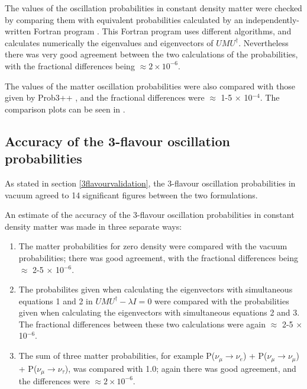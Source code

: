 The values of the oscillation probabilities in constant density matter were checked by comparing them with equivalent probabilities calculated by an 
independently-written Fortran program \cite{sloan}. This Fortran program uses different algorithms, and calculates numerically the eigenvalues and 
eigenvectors of $U M U^{\dagger}$. Nevertheless there was very good agreement between the two calculations of the probabilities, with the 
fractional differences being $\approx 2 \times 10^{-6}$. 

The values of the matter oscillation probabilities were also compared with those given by Prob3++ \cite{Prob3}, and the fractional differences were 
$\approx$ 1-5 $\times$ 10$^{-4}$. The comparison plots can be seen in \cite{Compwithprob3}.

\subsection{Accuracy of the 3-flavour oscillation probabilities} 
\label{3flavouraccuracy}

As stated in section \ref{3flavourvalidation}, the 3-flavour oscillation probabilities in vacuum agreed to 14 significant figures between the two 
formulations.

An estimate of the accuracy of the 3-flavour oscillation probabilities in constant density matter was made in three separate ways: 
\begin{enumerate}
\item The matter probabilities for zero density were compared with the vacuum probabilities; there was good agreement, with the fractional differences being 
$\approx$ 2-5 $\times$ 10$^{-6}$. 
\item The probabilites given when calculating the eigenvectors with simultaneous equations 1 and 2 in $U M U^{\dagger} - \lambda I = 0$ were compared 
with the probabilities given when calculating the eigenvectors with simultaneous equations 2 and 3. The fractional differences between these two 
calculations were again $\approx$ 2-5 $\times$ 10$^{-6}$.
\item The sum of three matter probabilities, for example P($\nu_{\mu} \rightarrow \nu_{e}$) + P($\nu_{\mu} \rightarrow \nu_{\mu}$) + 
P($\nu_{\mu} \rightarrow \nu_{\tau}$), was compared with 1.0; again there was good agreement, and the differences were $\approx 2 \times 10^{-6}$. 
\end{enumerate}

